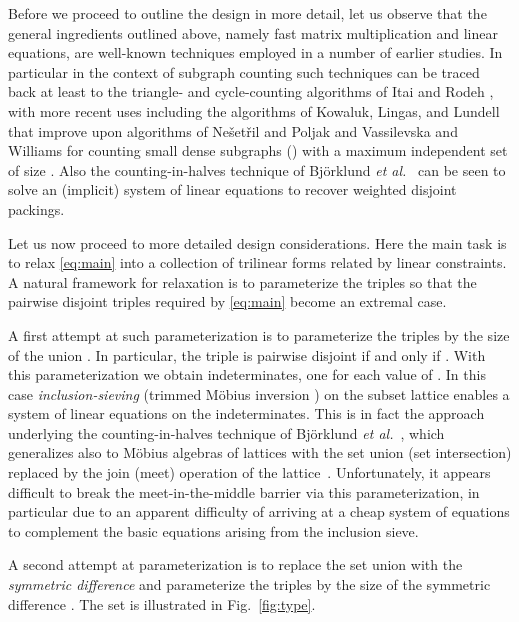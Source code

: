 \documentclass{amsart}
\begin{document}
Before we proceed to outline the design in more detail, let us observe
that the general ingredients outlined above, namely fast matrix multiplication
and linear equations, are well-known techniques employed in a number of
earlier studies. In particular in the context of subgraph counting 
such techniques can be traced back at least to the triangle- and 
cycle-counting algorithms of Itai and Rodeh \cite{IR78}, with more recent 
uses including the algorithms of Kowaluk, Lingas, and Lundell~\cite{KLL}
that improve upon algorithms of 
Ne\v{s}et\v{r}il and Poljak \cite{NP85}
and 
Vassilevska and Williams \cite{VW09} 
for counting small dense subgraphs 
() with a maximum independent set of size . 
Also the counting-in-halves technique of 
Bj\"orklund {\em et al.}~\cite{BHKK09} can be seen to solve an 
(implicit) system of linear equations to recover weighted disjoint 
packings.

Let us now proceed to more detailed design considerations.
Here the main task is to relax \eqref{eq:main} 
into a collection of trilinear forms related by linear constraints.
A natural framework for relaxation is to parameterize the triples 
 so that the pairwise disjoint triples required by \eqref{eq:main} 
become an extremal case. 

A first attempt at such parameterization is to parameterize the triples 
 by the size of the union . In particular,
the triple  is pairwise disjoint if and only if .
With this parameterization we obtain  indeterminates, one for each 
value of . In this case {\em inclusion-sieving} 
(trimmed M\"obius inversion \cite{BHKK09,BHKK10}) 
on the subset lattice  enables a system of linear
equations on the indeterminates. This is in fact the approach underlying 
the counting-in-halves technique of Bj\"orklund {\em et al.}~\cite{BHKK09},
which generalizes also to M\"obius algebras of lattices with 
the set union (set intersection) replaced by the join (meet) operation of 
the lattice~\cite{BHKKNP12}. Unfortunately, it appears difficult to break 
the meet-in-the-middle barrier via this parameterization, in particular 
due to an apparent difficulty of arriving at a cheap system of equations 
to complement the basic equations arising from the inclusion sieve.

A second attempt at parameterization is to replace the set union  
with the {\em symmetric difference} 
 and parameterize
the triples  by the size of the symmetric difference 
. The set  is illustrated
in Fig.~\ref{fig:type}.
\end{document}
